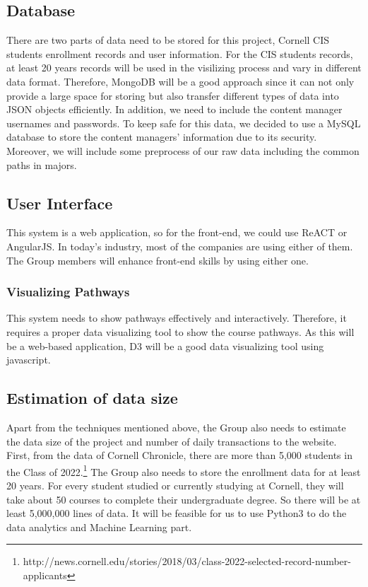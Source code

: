 \documentclass{article}
\begin{document}
\subsection{Database}
There are two parts of data need to be stored for this project, Cornell CIS students enrollment records and user information.  For the CIS students records, at least 20 years records will be used in the visilizing process and vary in different data format. Therefore, MongoDB will be a good approach since it can not only provide a large space for storing but also transfer different types of data into JSON objects efficiently. In addition, we need to include the content manager usernames and passwords. To keep safe for this data, we decided to use a MySQL database to store the content managers’ information due to its security. Moreover, we will include some preprocess of our raw data including the common paths in majors.
\subsection{User Interface}
This system is a web application, so for the front-end, we could use ReACT or AngularJS. In today’s industry, most of the companies are using either of them. The Group members will enhance front-end skills by using either one.
\subsubsection{Visualizing Pathways}
This system needs to show pathways effectively and interactively. Therefore, it requires a proper data visualizing tool to show the course pathways. As this will be a web-based application, D3 will be a good data visualizing tool using javascript.

\subsection{Estimation of data size}
Apart from the techniques mentioned above, the Group also needs to estimate the data size of the project and number of daily transactions to the website. First, from the data of Cornell Chronicle, there are more than 5,000 students in the Class of 2022.\footnote{http://news.cornell.edu/stories/2018/03/class-2022-selected-record-number-applicants} The Group also needs to store the enrollment data for at least 20 years. For every student studied or currently studying at Cornell, they will take about 50 courses to complete their undergraduate degree. So there will be at least 5,000,000 lines of data. It will be feasible for us to use Python3 to do the data analytics and Machine Learning part.
\end{document}
